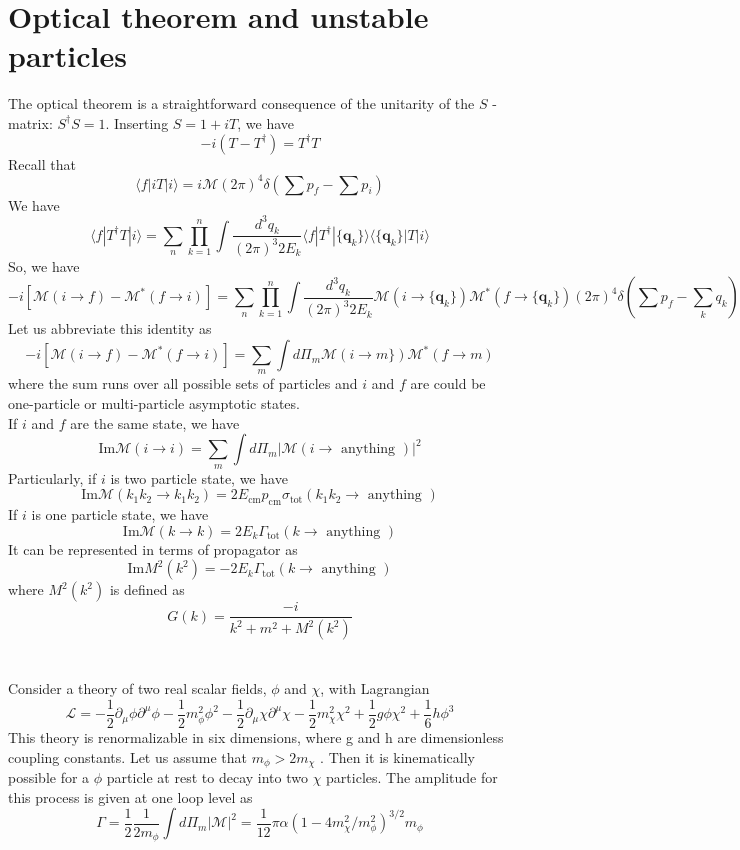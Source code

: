 \section{Optical theorem and unstable particles}
The optical theorem is a straightforward consequence of the unitarity of the $S$ -matrix: $S^{\dagger}S = 1$. 
Inserting $S = 1 + iT$, we have
\[-i(T - T^{\dagger}) = T^{\dagger}T\]
Recall that
\[\langle f | iT | i \rangle = i\mathcal{M}(2\pi)^4\delta(\sum p_f - \sum p_i)\]
We have
\[\langle f | T^{\dagger}T | i \rangle = \sum_n \prod_{k=1}^n \int \frac{d^3q_k}{(2\pi)^3 2E_k} \langle f | T^{\dagger} | \{\bm{q}_k\} \rangle \langle \{\bm{q}_k\} | T | i \rangle\]
So, we have
\[-i[\mathcal{M}(i \to f) - \mathcal{M}^{*}(f \to i)] =  \sum_n \prod_{k=1}^n \int \frac{d^3q_k}{(2\pi)^3 2E_k} \mathcal{M}(i \to \{\bm{q}_k\}) \mathcal{M}^{*}(f \to \{\bm{q}_k\}) (2\pi)^4 \delta(\sum p_f- \sum_k q_k)\]
Let us abbreviate this identity as
\[-i[\mathcal{M}(i \to f) - \mathcal{M}^{*}(f \to i)] = \sum_m \int d\Pi_{m} \mathcal{M}(i \to m\}) \mathcal{M}^{*}(f \to m)\]
where the sum runs over all possible sets of particles and $i$ and $f$ are could be one-particle or multi-particle asymptotic states.
\\
If $i$ and $f$ are the same state, we have
\[\mathrm{Im} \mathcal{M}(i \to i) = \sum_m \int d\Pi_{m} |\mathcal{M}(i \to \mbox{ anything })|^2\]
Particularly, if $i$ is two particle state, we have
\[\mathrm{Im} \mathcal{M}(k_1k_2 \to k_1k_2) = 2E_{\mathrm{cm}}p_{\mathrm{cm}}\sigma_{\mathrm{tot}}(k_1k_2 \to \mbox{ anything })\]
If $i$ is one particle state, we have
\[\mathrm{Im} \mathcal{M}(k \to k) = 2E_{k}\Gamma_{\mathrm{tot}}(k \to \mbox{ anything })\]
It can be represented in terms of propagator as
\[\mathrm{Im} M^2(k^2) = -2E_{k}\Gamma_{\mathrm{tot}}(k \to \mbox{ anything })\]
where $M^2(k^2)$ is defined as
\[G(k) = \frac{-i}{k^2+m^2+M^2(k^2)}\]
\\ \\
Consider a theory of two real scalar fields, $\phi$ and $\chi$, with Lagrangian
\[\mathcal{L} = -\frac{1}{2}\partial_{\mu}\phi \partial^{\mu}\phi - \frac{1}{2}m_{\phi}^2\phi^2 -\frac{1}{2}\partial_{\mu}\chi \partial^{\mu}\chi - \frac{1}{2}m_{\chi}^2\chi^2 + \frac{1}{2}g\phi\chi^2 + \frac{1}{6}h\phi^3\]
This theory is renormalizable in six dimensions, where g and h are dimensionless coupling constants. Let us assume that $m_{\phi} > 2m_{\chi}$ . Then it is kinematically possible for a $\phi$ particle at rest to decay into two $\chi$ particles.
The amplitude for this process is given at one loop level as
\[\Gamma = \frac{1}{2} \frac{1}{2m_{\phi}} \int d\Pi_m |\mathcal{M}|^2 = \frac{1}{12} \pi \alpha (1 - 4m_{\chi}^2/m_{\phi}^2)^{3/2}m_{\phi}\]
